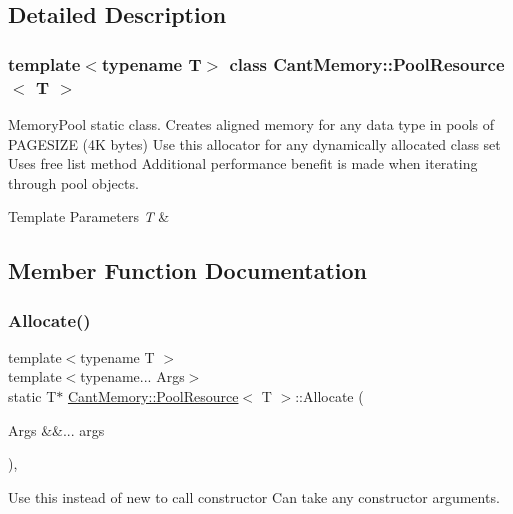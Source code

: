 \subsection{Detailed Description}
\subsubsection*{template$<$typename T$>$\newline
class Cant\+Memory\+::\+Pool\+Resource$<$ T $>$}

Memory\+Pool static class. Creates aligned memory for any data type in pools of P\+A\+G\+E\+S\+I\+ZE (4K bytes) Use this allocator for any dynamically allocated class set Uses free list method Additional performance benefit is made when iterating through pool objects. 


\begin{DoxyTemplParams}{Template Parameters}
{\em T} & \\
\hline
\end{DoxyTemplParams}


\subsection{Member Function Documentation}
\mbox{\label{classCantMemory_1_1PoolResource_ad8abdfebe3daa75136204130e49c1fab}} 
\subsubsection{\texorpdfstring{Allocate()}{Allocate()}}
{\footnotesize\ttfamily template$<$typename T $>$ \\
template$<$typename... Args$>$ \\
static T$\ast$ \hyperlink{classCantMemory_1_1PoolResource}{Cant\+Memory\+::\+Pool\+Resource}$<$ T $>$\+::Allocate (\begin{DoxyParamCaption}\item[{Args \&\&...}]{args }\end{DoxyParamCaption})\hspace{0.3cm}{\ttfamily [inline]}, {\ttfamily [static]}}



Use this instead of new to call constructor Can take any constructor arguments. 


